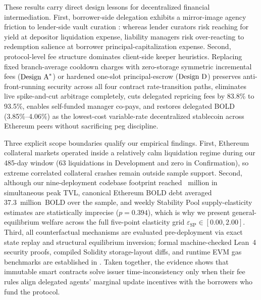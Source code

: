 These results carry direct design lessons for decentralized financial intermediation. First, borrower-side delegation exhibits a mirror-image agency friction to lender-side vault curation \citep{chitra2025curationary,mancino2026sok}: whereas lender curators risk reaching for yield at depositor liquidation expense, liability managers risk over-reacting to redemption salience at borrower principal-capitalization expense. Second, protocol-level fee structure dominates client-side keeper heuristics. Replacing fixed branch-average cooldown charges with zero-storage symmetric incremental fees ($\text{Design A}^*$) or hardened one-slot principal-escrow ($\text{Design D}$) preserves anti-front-running security across all four contract rate-transition paths, eliminates live spike-and-cut arbitrage completely, cuts delegated repricing fees by 83.8\% to 93.5\%, enables self-funded manager co-pays, and restores delegated BOLD (3.85\%--4.06\%) as the lowest-cost variable-rate decentralized stablecoin across Ethereum peers without sacrificing peg discipline.

Three explicit scope boundaries qualify our empirical findings. First, Ethereum collateral markets operated inside a relatively calm liquidation regime during our 485-day window (63 liquidations in Development and zero in Confirmation), so extreme correlated collateral crashes remain outside sample support. Second, although our nine-deployment codebase footprint reached ~million in simultaneous peak TVL, canonical Ethereum BOLD debt averaged 37.3~million~BOLD over the sample, and weekly Stability Pool supply-elasticity estimates are statistically imprecise ($p = 0.394$), which is why we present general-equilibrium welfare across the full five-point elasticity grid $\varepsilon_{\text{SP}} \in [0.00, 2.00]$. Third, all counterfactual mechanisms are evaluated pre-deployment via exact state replay and structural equilibrium inversion; formal machine-checked Lean~4 security proofs, compiled Solidity storage-layout diffs, and runtime EVM gas benchmarks are established in \citet{companion2026}. Taken together, the evidence shows that immutable smart contracts solve issuer time-inconsistency only when their fee rules align delegated agents' marginal update incentives with the borrowers who fund the protocol.
